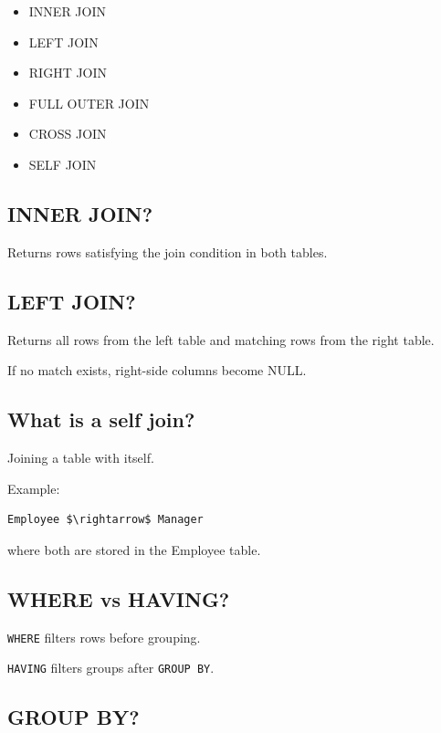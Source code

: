 \begin{itemize}
  \item INNER JOIN
  \item LEFT JOIN
  \item RIGHT JOIN
  \item FULL OUTER JOIN
  \item CROSS JOIN
  \item SELF JOIN
\end{itemize}

\medskip

\subsection{INNER JOIN?}

Returns rows satisfying the join condition in both tables.

\medskip

\subsection{LEFT JOIN?}

Returns all rows from the left table and matching rows from the right table.

If no match exists, right-side columns become NULL.

\medskip

\subsection{What is a self join?}

Joining a table with itself.

Example:

\begin{lstlisting}
Employee $\rightarrow$ Manager
\end{lstlisting}

where both are stored in the Employee table.

\medskip

\subsection{WHERE vs HAVING?}

\texttt{WHERE} filters rows before grouping.

\texttt{HAVING} filters groups after \texttt{GROUP BY}.

\medskip

\subsection{GROUP BY?}

